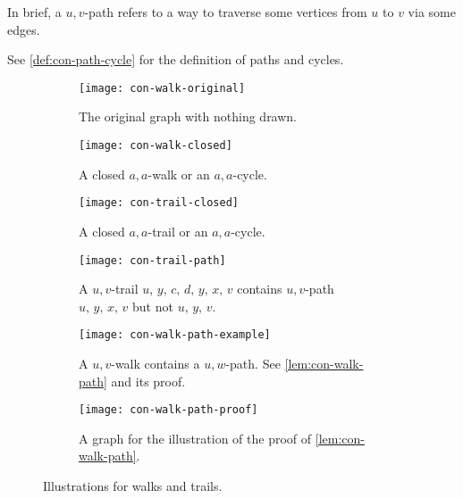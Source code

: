\documentclass[../src/handouts/main.tex]{subfiles}
\begin{document}
In brief, a $u,v$-path refers to a way to traverse some vertices from $u$ to $v$ via some edges.

See \cref{def:con-path-cycle} for the definition of paths and cycles.

\begin{figure}[htbp]
  \centering
  \begin{subfigure}[t]{.4\textwidth}
    \centering
    \texttt{[image: con-walk-original]}
    \caption{The original graph with nothing drawn.}
    \label{fig:con-walk-original}
  \end{subfigure}
  \hspace{.1\textwidth}
  \begin{subfigure}[t]{.4\textwidth}
    \centering
    \texttt{[image: con-walk-closed]}
    \caption{A closed $a,a$-walk or an $a,a$-cycle.}
    \label{fig:con-walk-closed}
  \end{subfigure}

  \vspace{2em}

  \begin{subfigure}[t]{.4\textwidth}
    \centering
    \texttt{[image: con-trail-closed]}
    \caption{A closed $a,a$-trail or an $a,a$-cycle.}
    \label{fig:con-trail-closed}
  \end{subfigure}
  \hspace{.1\textwidth}
  \begin{subfigure}[t]{.4\textwidth}
    \centering
    \texttt{[image: con-trail-path]}
    \caption{A $u,v$-trail $u,\, y,\, c,\, d,\, y,\, x,\, v$ contains $u,v$-path $u,\, y,\, x,\, v$ but not $u,\, y,\, v$.}
    \label{fig:con-trail-path}
  \end{subfigure}

  \vspace{2em}

  \begin{subfigure}[t]{.4\textwidth}
    \centering
    \texttt{[image: con-walk-path-example]}
    \caption{A $u,v$-walk contains a $u,w$-path. See \cref{lem:con-walk-path} and its proof.}
    \label{fig:con-walk-path-example}
  \end{subfigure}
  \hspace{.1\textwidth}
  \begin{subfigure}[t]{.4\textwidth}
    \centering
    \texttt{[image: con-walk-path-proof]}
    \caption{A graph for the illustration of the proof of \cref{lem:con-walk-path}.}
    \label{fig:con-walk-path-proof}
  \end{subfigure}

  \caption{Illustrations for walks and trails.}
  \label{fig:con-walk-trail}
\end{figure}
\end{document}
